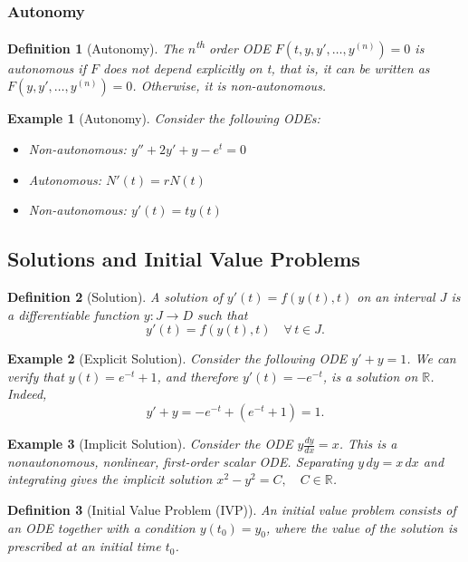 \documentclass{article}
\newtheorem{definition}{Definition}
\newtheorem*{example}{Example}
\newcommand{\R}{\mathbb{R}}
\begin{document}
\subsubsection{Autonomy}
\begin{definition}[Autonomy]
    The \(n\)\textsuperscript{th} order ODE \(F(t, y, y', \ldots, y^{(n)}) = 0\) is autonomous if \(F\) does not depend explicitly on t, that is, it can be written as \(F(y, y', \ldots, y^{(n)}) = 0\). Otherwise, it is non-autonomous.
\end{definition}
\begin{example}[Autonomy]
    Consider the following ODEs:
    \begin{itemize}
        \item Non-autonomous: \(y'' + 2y' + y - e^t = 0\)
        \item Autonomous: \(N'(t) = rN(t)\)
        \item Non-autonomous: \(y'(t) = ty(t)\)
    \end{itemize}
\end{example}

\subsection{Solutions and Initial Value Problems}
\begin{definition}[Solution]
    A solution of $y'(t) = f(y(t), t)$ on an interval $J$ is a 
    differentiable function $y : J \to D$ such that
    \[y'(t) = f(y(t), t) \quad \forall\, t \in J.\]
\end{definition}
\begin{example}[Explicit Solution]
    Consider the following ODE $y' + y = 1$. We can verify that \(y(t) = e^{-t} + 1\), and therefore \(y'(t) = -e^{-t}\), is a solution on \(\R\). Indeed,
    \[y' + y = -e^{-t} + (e^{-t} + 1) = 1.\]
\end{example}
\begin{example}[Implicit Solution]
    Consider the ODE $y \frac{dy}{dx} = x$. This is a nonautonomous, nonlinear, first-order scalar ODE. Separating $y\,dy = x\,dx$ and integrating gives the implicit solution $x^2 - y^2 = C, \quad C \in \R$.
\end{example}
\begin{definition}[Initial Value Problem (IVP)]
    An initial value problem consists of an ODE together with a condition $y(t_0)=y_0$, where the value of the solution is prescribed at an initial time \(t_0\).
\end{definition}
\end{document}
